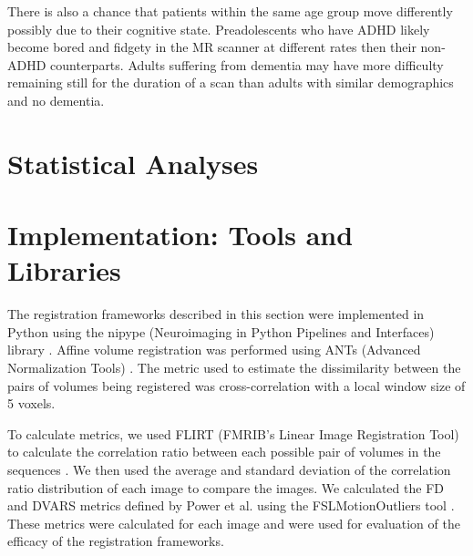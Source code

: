 There is also a chance that patients within the same age group move differently possibly due to their cognitive state. Preadolescents who have ADHD likely become bored and fidgety in the MR scanner at different rates then their non-ADHD counterparts. Adults suffering from dementia may have more difficulty remaining still for the duration of a scan than adults with similar demographics and no dementia.




\section{Statistical Analyses}

\section{Implementation: Tools and Libraries}

The registration frameworks described in this section were implemented in Python using the nipype (Neuroimaging in Python Pipelines and Interfaces) library \cite{Gorgolewski2011}. Affine volume registration was performed using ANTs (Advanced Normalization Tools) \cite{Avants2014}. The metric used to estimate the dissimilarity between the pairs of volumes being registered was cross-correlation with a local window size of 5 voxels. 

To calculate metrics, we used FLIRT (FMRIB’s Linear Image Registration Tool) to calculate the correlation ratio between each possible pair of volumes in the sequences \cite{Jenkinson2001} \cite{Jenkinson2002}. We then used the average and standard deviation of the correlation ratio distribution of each image to compare the images. We calculated the FD and DVARS metrics defined by Power et al. using the FSLMotionOutliers tool \cite{Power2012}. These metrics were calculated for each image and were used for evaluation of the efficacy of the registration frameworks.